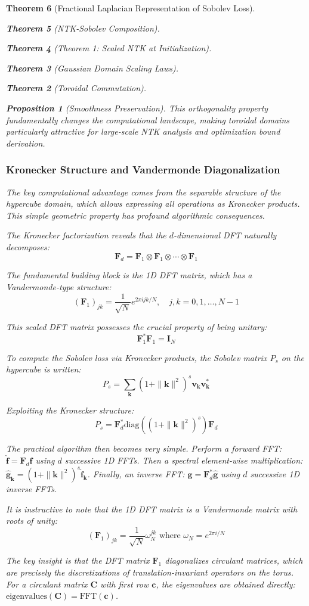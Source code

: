 \documentclass{article}
\newtheorem{theorem}{Theorem}[section]
\newtheorem{proposition}[theorem]{Proposition}
\begin{document}
\begin{theorem}[Fractional Laplacian Representation of Sobolev Loss]
\begin{theorem}[NTK-Sobolev Composition]
\begin{theorem}[Theorem 1: Scaled NTK at Initialization]
\begin{theorem}[Gaussian Domain Scaling Laws]
\begin{theorem}[Toroidal Commutation]
\begin{proposition}[Smoothness Preservation]
This orthogonality property fundamentally changes the computational landscape, making toroidal domains particularly attractive for large-scale NTK analysis and optimization bound derivation.

\subsubsection{Kronecker Structure and Vandermonde Diagonalization}

The key computational advantage comes from the separable structure of the hypercube domain, which allows expressing all operations as Kronecker products. This simple geometric property has profound algorithmic consequences.

The Kronecker factorization reveals that the $d$-dimensional DFT naturally decomposes:
\[ \mathbf{F}_d = \mathbf{F}_1 \otimes \mathbf{F}_1 \otimes \cdots \otimes \mathbf{F}_1 \]

The fundamental building block is the 1D DFT matrix, which has a Vandermonde-type structure:
\[ (\mathbf{F}_1)_{jk} = \frac{1}{\sqrt{N}} e^{2\pi i jk/N}, \quad j,k = 0, 1, \ldots, N-1 \]

This scaled DFT matrix possesses the crucial property of being unitary:
\[ \mathbf{F}_1^* \mathbf{F}_1 = \mathbf{I}_N \]

To compute the Sobolev loss via Kronecker products, the Sobolev matrix $P_s$ on the hypercube is written:
\[ P_s = \sum_{\mathbf{k}} (1 + \|\mathbf{k}\|^2)^s \mathbf{v}_{\mathbf{k}} \mathbf{v}_{\mathbf{k}}^* \]

Exploiting the Kronecker structure:
\[ P_s = \mathbf{F}_d^* \text{diag}((1 + \|\mathbf{k}\|^2)^s) \mathbf{F}_d \]

The practical algorithm then becomes very simple. Perform a forward FFT: $\hat{\mathbf{f}} = \mathbf{F}_d \mathbf{f}$ using $d$ successive 1D FFTs. Then a spectral element-wise multiplication: $\hat{\mathbf{g}}_{\mathbf{k}} = (1 + \|\mathbf{k}\|^2)^s \hat{\mathbf{f}}_{\mathbf{k}}$. Finally, an inverse FFT: $\mathbf{g} = \mathbf{F}_d^* \hat{\mathbf{g}}$ using $d$ successive 1D inverse FFTs.

It is instructive to note that the 1D DFT matrix is a Vandermonde matrix with roots of unity:
\[ (\mathbf{F}_1)_{jk} = \frac{1}{\sqrt{N}} \omega_N^{jk} \text{ where } \omega_N = e^{2\pi i/N} \]

The key insight is that the DFT matrix $\mathbf{F}_1$ diagonalizes circulant matrices, which are precisely the discretizations of translation-invariant operators on the torus. For a circulant matrix $\mathbf{C}$ with first row $\mathbf{c}$, the eigenvalues are obtained directly: $\text{eigenvalues}(\mathbf{C}) = \text{FFT}(\mathbf{c})$.


\end{proposition}
\end{theorem}
\end{theorem}
\end{theorem}
\end{theorem}
\end{theorem}
\end{document}
